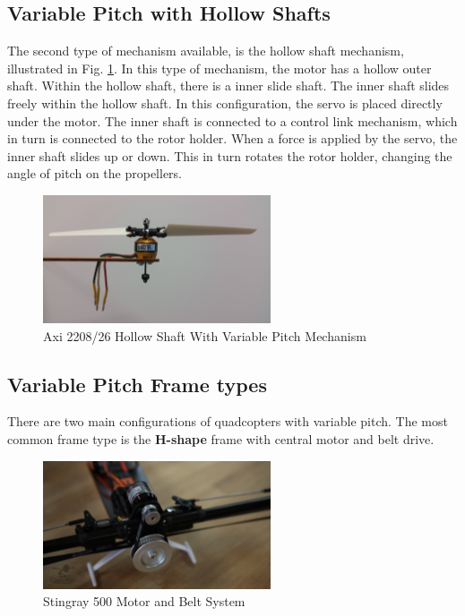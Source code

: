 \subsection{Variable Pitch with Hollow Shafts}
The second type of mechanism available, is the hollow shaft mechanism, illustrated in Fig. \ref{fig:Axi220826}. In this type of mechanism, the motor has a hollow outer shaft. Within the hollow shaft, there is a inner slide shaft. The inner shaft slides freely within the hollow shaft. In this configuration, the servo is placed directly under the motor. The inner shaft is connected to a control link mechanism, which in turn is connected to the rotor holder. When a force is applied by the servo, the inner shaft slides up or down. This in turn rotates the rotor holder, changing the angle of pitch on the propellers. 

\begin{figure}[H]
\centering
    \includegraphics[width = 0.6\textwidth]{VAPIQ-PICTURES/Axi2208}
    \caption{Axi 2208/26 Hollow Shaft With Variable Pitch Mechanism}
    \label{fig:Axi220826}    
\end{figure}


\subsection {Variable Pitch Frame types}
There are two main configurations of quadcopters with variable pitch. The most common frame type is the \textbf{H-shape} frame with central motor and belt drive. 

\begin{figure}[H]
\centering
    \includegraphics[width = 0.6\textwidth]{VAPIQ-PICTURES/hcop}
    \caption{Stingray 500 Motor and Belt System \cite{flitetest}}
    \label{fig:hcop}    
\end{figure}


